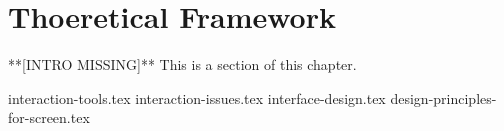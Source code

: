 
\section{Thoeretical Framework}
**[INTRO MISSING]**
This is a section of this chapter.

{interaction-tools.tex}
{interaction-issues.tex}
{interface-design.tex}
{design-principles-for-screen.tex}
